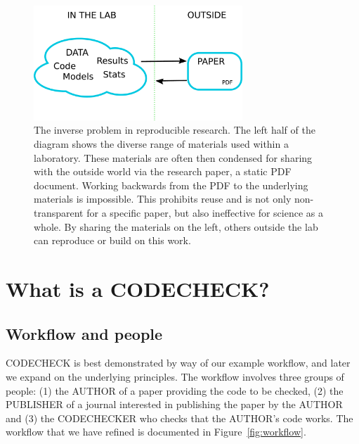 \documentclass[12pt]{article}
\begin{document}
\begin{figure}
  \centering
  \includegraphics[width=0.7\textwidth]{figs/rr.pdf}
  \caption{The inverse problem in reproducible research.  The left
  half of the diagram shows the diverse range of materials used
  within a laboratory.  These materials are often then
  condensed for sharing with the outside world via the
  research paper, a static PDF document.  Working backwards from the
  PDF to the underlying materials is impossible. This prohibits reuse
  and is not only non-transparent for a specific paper, but also 
  ineffective for science as a whole. By sharing the
  materials on the left, others outside the lab can reproduce
  or build on this work.}
  \label{fig:inverse}
\end{figure}

\section*{What is a CODECHECK?}\label{what-is-a-codecheck}

\subsection*{Workflow and people}\label{workflow-people}

CODECHECK is best demonstrated by way of our example workflow, and later
we expand on the underlying principles. The workflow involves three
groups of people: (1) the AUTHOR of a paper providing the code to be checked, (2)
the PUBLISHER of a journal interested in publishing the paper by the
AUTHOR and (3) the CODECHECKER who checks that the AUTHOR's code works.
The workflow that we have refined is documented in Figure~\ref{fig:workflow}.

\end{document}
